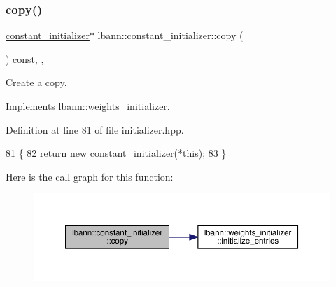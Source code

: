 \subsubsection{\texorpdfstring{copy()}{copy()}}
{\footnotesize\ttfamily \hyperlink{classlbann_1_1constant__initializer}{constant\+\_\+initializer}$\ast$ lbann\+::constant\+\_\+initializer\+::copy (\begin{DoxyParamCaption}{ }\end{DoxyParamCaption}) const\hspace{0.3cm}{\ttfamily [inline]}, {\ttfamily [override]}, {\ttfamily [virtual]}}

Create a copy. 

Implements \hyperlink{classlbann_1_1weights__initializer_acc84ce49188b74b23987cef3db18525a}{lbann\+::weights\+\_\+initializer}.



Definition at line 81 of file initializer.\+hpp.


\begin{DoxyCode}
81                                               \{
82     \textcolor{keywordflow}{return} \textcolor{keyword}{new} \hyperlink{classlbann_1_1constant__initializer_a2b8096bcc8c5a8c780926594d1b8441d}{constant\_initializer}(*\textcolor{keyword}{this});
83   \}
\end{DoxyCode}
Here is the call graph for this function\+:\nopagebreak
\begin{figure}[H]
\begin{center}
\leavevmode
\includegraphics[width=350pt]{classlbann_1_1constant__initializer_a1af9be89f528045f47abf13818d814ce_cgraph}
\end{center}
\end{figure}
\mbox{\label{classlbann_1_1constant__initializer_ae3fb3bba90bd6a7e393ecc223aa5d62c}} 
